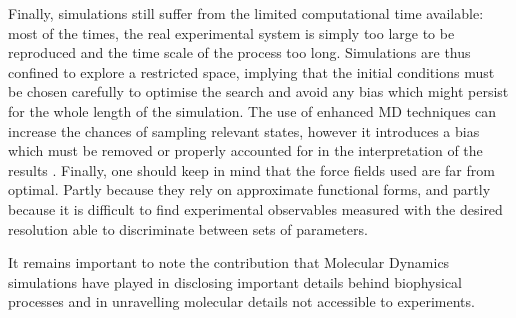 \documentclass[graybox]{svmult}
\begin{document}
Finally, simulations still suffer from the limited computational time available: most of the times, the real experimental system is simply too large to be reproduced and the time scale of the process too long. Simulations are thus confined to explore a restricted space, implying that the initial conditions must be chosen carefully to optimise the search and avoid any bias which might persist for the whole length of the simulation. The use of enhanced MD techniques can increase the chances of sampling relevant states, however it introduces a bias which must be removed or properly accounted for in the interpretation of the results \cite{Bernardi2015,Best2005,Barducci2010,Barducci2011,Mills2008}.
Finally, one should keep in mind that the force fields used are far from optimal. Partly because they rely on approximate functional forms, and partly because it is difficult to find experimental observables measured with the desired resolution able to discriminate between sets of parameters.

It remains important to note the contribution that Molecular Dynamics simulations have played in disclosing important details behind biophysical processes and in unravelling molecular details not accessible to experiments.

%


%
\end{document}
